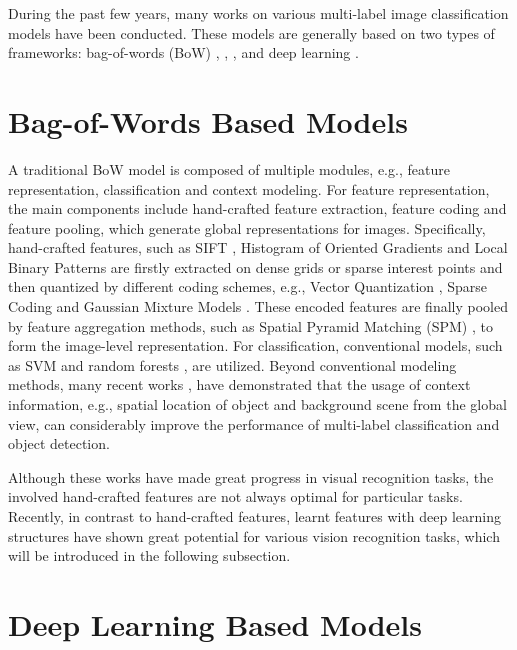 During the past few years, many works on various
multi-label image classification models have been conducted. These models are generally based on two
types of frameworks: bag-of-words (BoW) \cite{18}, \cite{12},
\cite{13}, \cite{14} and deep learning \cite{19}.

\section{Bag-of-Words Based Models}

A traditional BoW model is composed of multiple
modules, e.g., feature representation, classification
and context modeling. For feature representation,
the main components include hand-crafted feature
extraction, feature coding and feature pooling, which
generate global representations for images. Specifically, hand-crafted features, such as SIFT \cite{3}, Histogram of Oriented Gradients \cite{20} and Local Binary
Patterns \cite{21} are firstly extracted on dense grids or
sparse interest points and then quantized by different
coding schemes, e.g., Vector Quantization \cite{22}, Sparse
Coding and Gaussian Mixture Models \cite{23}. These
encoded features are finally pooled by feature aggregation methods, such as Spatial Pyramid Matching
(SPM) \cite{4}, to form the image-level representation. For
classification, conventional models, such as SVM \cite{6}
and random forests \cite{7}, are utilized. Beyond conventional modeling methods, many recent works \cite{18}, \cite{13} have demonstrated that the usage
of context information, e.g., spatial location of object
and background scene from the global view, can
considerably improve the performance of multi-label
classification and object detection. \hfill \break

Although these works have made great progress
in visual recognition tasks, the involved hand-crafted
features are not always optimal for particular tasks.
Recently, in contrast to hand-crafted features, learnt
features with deep learning structures have shown
great potential for various vision recognition tasks,
which will be introduced in the following subsection.

\section{Deep Learning Based Models}

